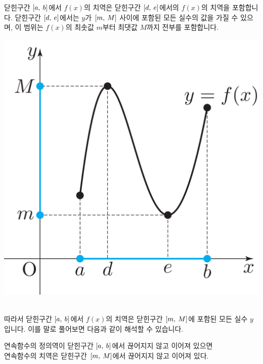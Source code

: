 닫힌구간 $\left[a,\: b\right]$에서 $f\left( x \right) $의 치역은 닫힌구간 $\left[d,\: e\right]$에서의 $f\left( x \right) $의 치역을 포함합니다.
닫힌구간 $\left[d,\: e\right]$에서는 $y$가 $\left[m,\: M\right]$ 사이에 포함된 모든 실수의 값을  가질 수 있으며, 이 범위는 $f\left( x \right) $의 최솟값 $m$부터 최댓값 $M$까지 전부를 포함합니다.
\begin{center} \includegraphics[scale=\pgfkeysvalueof{picsize}]{DBs/pic/zerg_08.pdf}\
	\end{center}따라서 닫힌구간 $\left[a,\: b\right]$에서 $f\left( x \right) $의 치역은 닫힌구간 $\left[m,\: M\right]$에 포함된 모든 실수 $y$입니다. 이를 말로 풀어보면 다음과 같이 해석할 수 있습니다.\begin{center}
    연속함수의 정의역이 닫힌구간 $\left[a,\: b\right]$에서 끊어지지 않고 이어져 있으면\\
    연속함수의 치역은 닫힌구간 $\left[m,\: M\right]$에서 끊어지지 않고 이어져 있다.
\end{center}